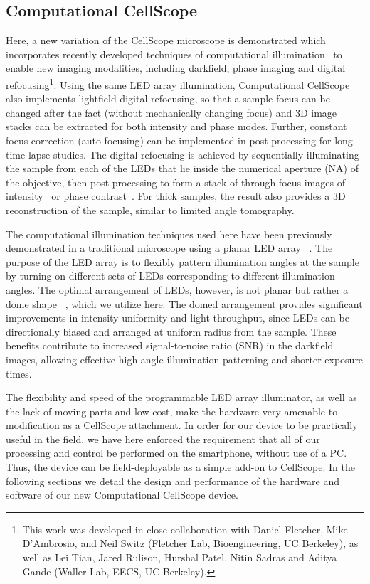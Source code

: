 \subsection{Computational CellScope}\label{sec:fabrication:ccs}
Here, a new variation of the CellScope microscope is demonstrated which incorporates recently developed techniques of computational illumination~\cite{Zheng2011, Tian14, zijiMulti} to enable new imaging modalities, including darkfield, phase imaging and digital refocusing\footnote{This work was developed in close collaboration with Daniel Fletcher, Mike D'Ambrosio, and Neil Switz (Fletcher Lab, Bioengineering, UC Berkeley), as well as Lei Tian, Jared Rulison, Hurshal Patel, Nitin Sadras and Aditya Gande (Waller Lab, EECS, UC Berkeley).}. Using the same LED array illumination, Computational CellScope also implements lightfield digital refocusing, so that a sample focus can be changed after the fact (without mechanically changing focus) and 3D image stacks can be extracted for both intensity and phase modes. Further, constant focus correction (auto-focusing) can be implemented in post-processing for long time-lapse studies. The digital refocusing is achieved by sequentially illuminating the sample from each of the LEDs that lie inside the numerical aperture (NA) of the objective, then post-processing to form a stack of through-focus images of intensity~\cite{Ng2005,Zheng2011} or phase contrast~\cite{Tian14}. For thick samples, the result also provides a 3D reconstruction of the sample, similar to limited angle tomography.

The computational illumination techniques used here have been previously demonstrated in a traditional microscope using a planar LED array ~\cite{Zheng2011,Zheng2013,Tian14,zijiMulti,tian20153d}. The purpose of the LED array is to flexibly pattern illumination angles at the sample by turning on different sets of LEDs corresponding to different illumination angles. The optimal arrangement of LEDs, however, is not planar but rather a dome shape ~\cite{Dominguez:14}, which we utilize here. The domed arrangement provides significant improvements in intensity uniformity and light throughput, since LEDs can be directionally biased and arranged at uniform radius from the sample. These benefits contribute to increased signal-to-noise ratio (SNR) in the darkfield images, allowing effective high angle illumination patterning and shorter exposure times.

The flexibility and speed of the programmable LED array illuminator, as well as the lack of moving parts and low cost, make the hardware very amenable to modification as a CellScope attachment. In order for our device to be practically useful in the field, we have here enforced the requirement that all of our processing and control be performed on the smartphone, without use of a PC. Thus, the device can be field-deployable as a simple add-on to CellScope. In the following sections we detail the design and performance of the hardware and software of our new Computational CellScope device.

